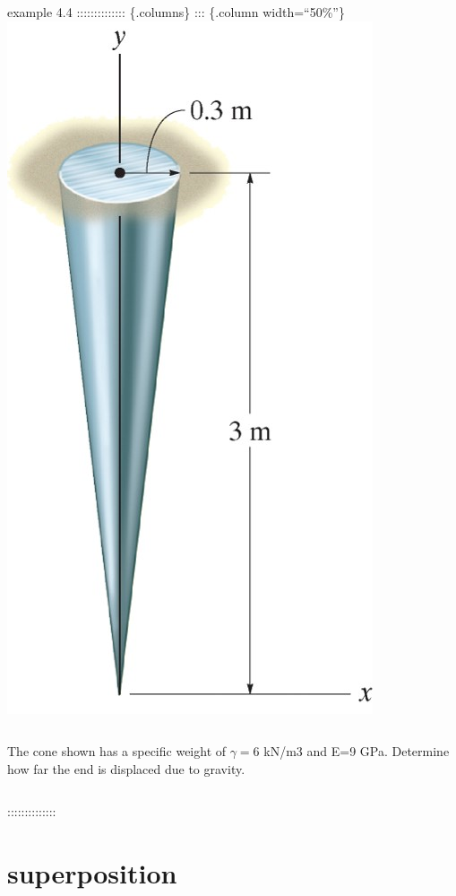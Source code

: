 \documentclass[
  letterpaper,
  ignorenonframetext,
  aspectratio=43,
  handout,
  12pt]{beamer}
\let\Oldincludegraphics\includegraphics
\renewcommand{\includegraphics}[2][]{\Oldincludegraphics[width=\textwidth,height=0.7\textheight,keepaspectratio]{#2}}
\begin{document}
\begin{frame}{example 4.4}
\protect\hypertarget{example-4.4}{}
:::::::::::::: \{.columns\} ::: \{.column width=``50\%''\}
\includegraphics{../images/example-4-4.jpg}

\begin{column}{0.5\textwidth}
The cone shown has a specific weight of \(\gamma = 6\) kN/m3 and E=9
GPa. Determine how far the end is displaced due to gravity.
\end{column}

::::::::::::::
\end{frame}

\hypertarget{superposition}{%
\section{superposition}\label{superposition}}
\end{document}
